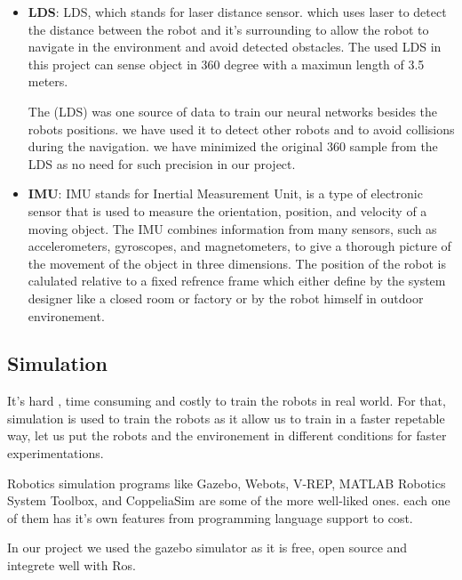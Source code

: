 \documentclass[12pt]{extarticle}
\begin{document}
\begin{itemize}
\item \textbf{LDS}:  LDS, which stands for laser distance sensor. which uses laser to detect the distance between the robot and it's surrounding to allow the robot to navigate in the environment and avoid detected obstacles. The used LDS in this project can  sense object in 360 degree with a maximun length of 3.5 meters.
 

The (LDS) was one  source of data to train our neural networks besides the robots positions. we have used it to detect other robots and to avoid collisions during the navigation. we have minimized the original 360 sample from the LDS as no need for such precision in our project. 
     
\item \textbf{IMU}: IMU stands for Inertial Measurement Unit, is a type of electronic sensor that is used to measure the orientation, position, and velocity of a moving object. The IMU combines information from many sensors, such as accelerometers, gyroscopes, and magnetometers, to give a thorough picture of the movement of the object in three dimensions. The position of the robot is calulated relative to a fixed  refrence frame which either define by the system designer like a closed room or factory or by the robot himself in outdoor environement.







\end{itemize}

   



\subsection{Simulation}
It's hard , time consuming and  costly to train the robots in real world. For that, simulation is used to train the robots as it allow us to train in a faster repetable way,  let us put the robots and the environement  in different conditions  for faster experimentations.


Robotics simulation programs like Gazebo, Webots, V-REP, MATLAB Robotics System Toolbox, and CoppeliaSim are some of the more well-liked ones. each one of them has it's own features from programming language support to cost.

In our project we used the gazebo simulator as it is free, open source and integrete well with Ros.
\end{document}
